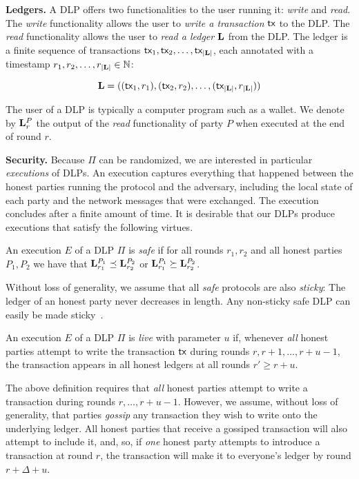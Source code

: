 \noindent
\textbf{Ledgers.}
A DLP offers two functionalities to the user running
it: \emph{write} and \emph{read}. The \emph{write} functionality allows the
user to \emph{write a transaction} $\textsf{tx}$ to the DLP. The \emph{read}
functionality allows the user to \emph{read a ledger} $\mathbf{L}$ from the DLP.
The ledger is a finite sequence of transactions
$\textsf{tx}_1, \textsf{tx}_2, \ldots, \textsf{tx}_{|\mathbf{L}|}$,
each annotated with a timestamp $r_1, r_2, \ldots, r_{|\mathbf{L}|} \in \mathbb{N}$:

\[
  \mathbf{L} = ((\textsf{tx}_1, r_1), (\textsf{tx}_2, r_2), \ldots, (\textsf{tx}_{|\mathbf{L}|}, r_{|\mathbf{L}|}))
\]

The user of a DLP is typically a computer program such as a wallet.
We denote by $\mathbf{L}^P_r$ the output of the \emph{read} functionality of
party $P$ when executed at the end of round $r$.

\noindent
\textbf{Security.}
Because $\Pi$ can be randomized, we are interested in particular
\emph{executions} of DLPs. An execution captures
everything that happened between the honest parties running the
protocol and the adversary, including the local state of each
party and the network messages that were exchanged. The execution
concludes after a finite amount of time. It is desirable that our
DLPs produce executions that satisfy the following virtues.

\begin{definition}[Safe]
  An execution $E$ of a DLP $\Pi$ is \emph{safe} if for all rounds $r_1, r_2$
  and all honest parties $P_1, P_2$ we have that
  $\mathbf{L}^{P_1}_{r_1} \preceq \mathbf{L}^{P_2}_{r_2}$ or
  $\mathbf{L}^{P_1}_{r_1} \succeq \mathbf{L}^{P_2}_{r_2}$.
\end{definition}

Without loss of generality, we assume that all \emph{safe} protocols
are also \emph{sticky}: The ledger of an honest party never decreases in
length. Any non-sticky safe DLP can easily be made sticky~\cite{streamlet}.

\begin{definition}[Live]
  An execution $E$ of a DLP $\Pi$ is \emph{live} with parameter $u$ if, whenever
  \emph{all} honest parties attempt to write the transaction $\textsf{tx}$ during
  rounds $r, r + 1, \ldots, r + u - 1$, the transaction appears in all
  honest ledgers at all rounds $r' \geq r + u$.
\end{definition}

The above definition requires that \emph{all} honest parties attempt to
write a transaction during rounds $r, \ldots, r + u - 1$. However, we
assume, without loss of generality,
that parties \emph{gossip} any transaction they wish to write onto
the underlying ledger. All honest parties that receive a gossiped transaction
will also attempt to include it, and, so, if \emph{one} honest party
attempts to introduce a transaction at round $r$, the transaction will
make it to everyone's ledger by round $r + \Delta + u$.

